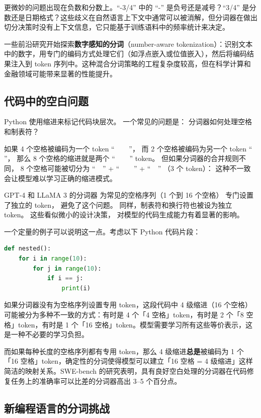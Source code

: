 更微妙的问题出现在负数和分数上。“-3/4” 中的 “-” 是负号还是减号？“3/4” 是分数还是日期格式？这些歧义在自然语言上下文中通常可以被消解，但分词器在做出切分决策时没有上下文信息，它只能基于训练语料中的频率统计来决定。

一些前沿研究开始探索\textbf{数字感知的分词}（number-aware tokenization）：识别文本中的数字，用专门的编码方式处理它们（如浮点嵌入或位值嵌入），然后将编码结果注入到 token 序列中。这种混合分词策略的工程复杂度较高，但在科学计算和金融领域可能带来显著的性能提升。

\subsection{代码中的空白问题}

Python 使用缩进来标记代码块层次。
一个常见的问题是：
分词器如何处理空格和制表符？

如果 4 个空格被编码为一个 token “\verb|    |”，
而 2 个空格被编码为另一个 token “\verb|  |”，
那么 8 个空格的缩进就是两个
“\verb|    |” token。
但如果分词器的合并规则不同，
8 个空格可能被切分为
“\verb|  |” + “\verb|    |” + “\verb|  |”
（3 个 token）：
这种不一致会让模型难以学习正确的缩进模式。

GPT-4 和 LLaMA 3 的分词器
为常见的空格序列（1 个到 16 个空格）
专门设置了独立的 token，
避免了这个问题。
同样，制表符和换行符也被设为独立 token。
这些看似微小的设计决策，
对模型的代码生成能力有着显著的影响。

一个定量的例子可以说明这一点。考虑以下 Python 代码片段：

\begin{lstlisting}[caption={Indentation-sensitive Python code}, language=Python]
def nested():
    for i in range(10):
        for j in range(10):
            if i == j:
                print(i)
\end{lstlisting}

如果分词器没有为空格序列设置专用 token，这段代码中 4 级缩进（16 个空格）可能被分为多种不一致的方式：有时是 4 个「4 空格」token，有时是 2 个「8 空格」token，有时是 1 个「16 空格」token。模型需要学习所有这些等价表示，这是一种不必要的学习负担。

而如果每种长度的空格序列都有专用 token，那么 4 级缩进\textbf{总是}被编码为 1 个「16 空格」token，确定性的分词使得模型可以建立「16 空格 = 4 级缩进」这样简洁的映射关系。SWE-bench 的研究表明，具有良好空白处理的分词器在代码修复任务上的准确率可以比差的分词器高出 3--5 个百分点。

\subsection{新编程语言的分词挑战}

